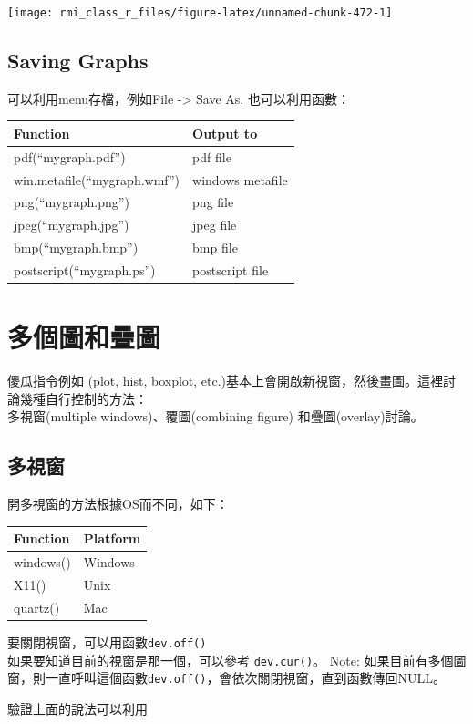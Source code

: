 \documentclass[]{book}
\theoremstyle{definition}
\theoremstyle{definition}
\theoremstyle{definition}
\theoremstyle{remark}
\begin{document}
\begin{center}\texttt{[image: rmi\_class\_r\_files/figure-latex/unnamed-chunk-472-1]} \end{center}

\hypertarget{saving-graphs}{%
\subsection{Saving Graphs}\label{saving-graphs}}

可以利用menu存檔，例如File -\textgreater{} Save As. 也可以利用函數：

\begin{longtable}[]{@{}ll@{}}
\toprule
Function & Output to\tabularnewline
\midrule
\endhead
pdf(``mygraph.pdf'') & pdf file\tabularnewline
win.metafile(``mygraph.wmf'') & windows metafile\tabularnewline
png(``mygraph.png'') & png file\tabularnewline
jpeg(``mygraph.jpg'') & jpeg file\tabularnewline
bmp(``mygraph.bmp'') & bmp file\tabularnewline
postscript(``mygraph.ps'') & postscript file\tabularnewline
\bottomrule
\end{longtable}

\section{多個圖和疊圖}

傻瓜指令例如 (plot, hist, boxplot,
etc.)基本上會開啟新視窗，然後畫圖。這裡討論幾種自行控制的方法：\\
多視窗(multiple windows)、覆圖(combining figure) 和疊圖(overlay)討論。

\subsection{多視窗}

開多視窗的方法根據OS而不同，如下：

\begin{longtable}[]{@{}ll@{}}
\toprule
Function & Platform\tabularnewline
\midrule
\endhead
windows() & Windows\tabularnewline
X11() & Unix\tabularnewline
quartz() & Mac\tabularnewline
\bottomrule
\end{longtable}

要關閉視窗，可以用函數\texttt{dev.off()}\\
如果要知道目前的視窗是那一個，可以參考 \texttt{dev.cur()}。 Note:
如果目前有多個圖窗，則一直呼叫這個函數\texttt{dev.off()}，會依次關閉視窗，直到函數傳回NULL。

驗證上面的說法可以利用
\end{document}
